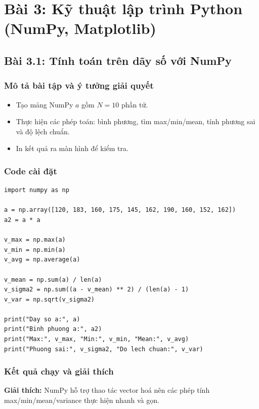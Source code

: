 \chapter{Bài 3: Kỹ thuật lập trình Python (NumPy, Matplotlib)}


\section{Bài 3.1: Tính toán trên dãy số với NumPy}
\subsection{Mô tả bài tập và ý tưởng giải quyết}
\begin{itemize}
  \item Tạo mảng NumPy \(a\) gồm \(N=10\) phần tử.
  \item Thực hiện các phép toán: bình phương, tìm max/min/mean, tính phương sai và độ lệch chuẩn.
  \item In kết quả ra màn hình để kiểm tra.
\end{itemize}

\subsection{Code cài đặt}
\begin{lstlisting}
import numpy as np

a = np.array([120, 183, 160, 175, 145, 162, 190, 160, 152, 162])
a2 = a * a

v_max = np.max(a)
v_min = np.min(a)
v_avg = np.average(a)

v_mean = np.sum(a) / len(a)
v_sigma2 = np.sum((a - v_mean) ** 2) / (len(a) - 1)
v_var = np.sqrt(v_sigma2)

print("Day so a:", a)
print("Binh phuong a:", a2)
print("Max:", v_max, "Min:", v_min, "Mean:", v_avg)
print("Phuong sai:", v_sigma2, "Do lech chuan:", v_var)
\end{lstlisting}

\subsection{Kết quả chạy và giải thích}

\textbf{Giải thích:} NumPy hỗ trợ thao tác vector hoá nên các phép tính max/min/mean/variance thực hiện nhanh và gọn.

